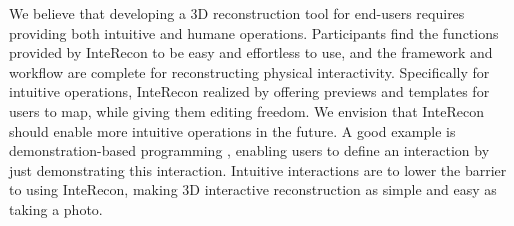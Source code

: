



We believe that developing a 3D reconstruction tool for end-users requires providing both intuitive and humane operations. 
Participants find the functions provided by InteRecon to be easy and effortless to use, and the framework and workflow are complete for reconstructing physical interactivity.
Specifically for intuitive operations, InteRecon realized by offering previews and templates for users to map, while giving them editing freedom.
We envision that InteRecon should enable more intuitive operations in the future. 
A good example is demonstration-based programming \cite{10.1145/3472749.3474769,lu2013gesture}, enabling users to define an interaction by just demonstrating this interaction.
Intuitive interactions are to lower the barrier to using InteRecon, making 3D interactive reconstruction as simple and easy as taking a photo. 

